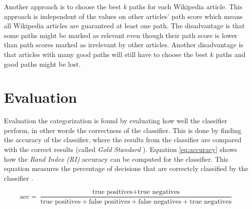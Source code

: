 
Another approach is to choose the best $k$ paths for each Wikipedia article. This approach is independent of the values on other articles' path score which means all Wikipedia articles are guaranteed at least one path. The disadvantage is that some paths might be marked as relevant even though their path score is lower than path scores marked as irrelevant by other articles. Another disadvantage is that articles with many good paths will still have to choose the best $k$ paths and good paths might be lost. 

\section{Evaluation}
Evaluation the categorization is found by evaluating how well the classifier perform, in other words the correctness of the classifier.
This is done by finding the accuracy of the classifier, where the results from the classifier are compared with the correct results (called \emph{Gold Standard} \cite{wiki:goldstandard}). Equation \ref{eq:accuracy} \cite{wiki:accuracy} shows how the \emph{Rand Index (RI)} accuracy can be computed for the classifier. This equation measures the percentage of decisions that are correctcly classified by the classifier \cite[p:~330]{iirbook}.

\begin{equation} \label{eq:accuracy}
\text{acc}=\frac{\text{true positives}+\text{true negatives}}{\text{true positives}+\text{false positives} + \text{false negatives} + \text{true negatives}}
\end{equation}

